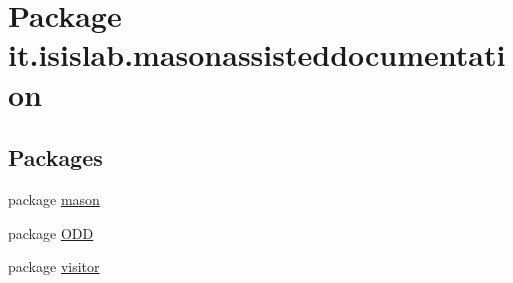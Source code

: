 \hypertarget{namespaceit_1_1isislab_1_1masonassisteddocumentation}{\section{Package it.\-isislab.\-masonassisteddocumentation}
\label{namespaceit_1_1isislab_1_1masonassisteddocumentation}
}
\subsection*{Packages}
\begin{DoxyCompactItemize}
\item 
package \hyperlink{namespaceit_1_1isislab_1_1masonassisteddocumentation_1_1mason}{mason}
\item 
package \hyperlink{namespaceit_1_1isislab_1_1masonassisteddocumentation_1_1_o_d_d}{O\-D\-D}
\item 
package \hyperlink{namespaceit_1_1isislab_1_1masonassisteddocumentation_1_1visitor}{visitor}
\end{DoxyCompactItemize}
